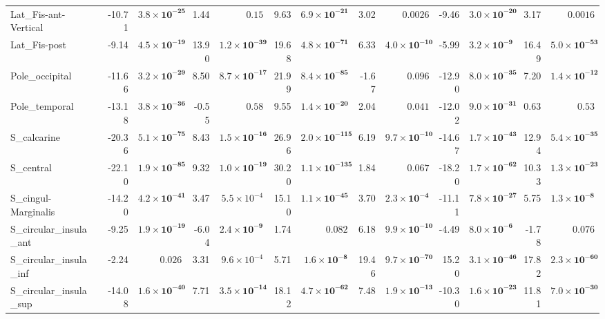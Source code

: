 {\begin{longtable}{llrrrrrrrrrrrr}
Lat\_Fis-ant-Vertical &  & -10.71 & $\mathbf{3.8{\times}10^{-25}}$ & 1.44 & $0.15$ & 9.63 & $\mathbf{6.9{\times}10^{-21}}$ & 3.02 & $0.0026$ & -9.46 & $\mathbf{3.0{\times}10^{-20}}$ & 3.17 & $0.0016$ \\
Lat\_Fis-post &  & -9.14 & $\mathbf{4.5{\times}10^{-19}}$ & 13.90 & $\mathbf{1.2{\times}10^{-39}}$ & 19.68 & $\mathbf{4.8{\times}10^{-71}}$ & 6.33 & $\mathbf{4.0{\times}10^{-10}}$ & -5.99 & $\mathbf{3.2{\times}10^{-9}}$ & 16.49 & $\mathbf{5.0{\times}10^{-53}}$ \\
Pole\_occipital &  & -11.66 & $\mathbf{3.2{\times}10^{-29}}$ & 8.50 & $\mathbf{8.7{\times}10^{-17}}$ & 21.99 & $\mathbf{8.4{\times}10^{-85}}$ & -1.67 & $0.096$ & -12.90 & $\mathbf{8.0{\times}10^{-35}}$ & 7.20 & $\mathbf{1.4{\times}10^{-12}}$ \\
Pole\_temporal &  & -13.18 & $\mathbf{3.8{\times}10^{-36}}$ & -0.55 & $0.58$ & 9.55 & $\mathbf{1.4{\times}10^{-20}}$ & 2.04 & $0.041$ & -12.02 & $\mathbf{9.0{\times}10^{-31}}$ & 0.63 & $0.53$ \\
S\_calcarine &  & -20.36 & $\mathbf{5.1{\times}10^{-75}}$ & 8.43 & $\mathbf{1.5{\times}10^{-16}}$ & 26.96 & $\mathbf{2.0{\times}10^{-115}}$ & 6.19 & $\mathbf{9.7{\times}10^{-10}}$ & -14.67 & $\mathbf{1.7{\times}10^{-43}}$ & 12.94 & $\mathbf{5.4{\times}10^{-35}}$ \\
S\_central &  & -22.10 & $\mathbf{1.9{\times}10^{-85}}$ & 9.32 & $\mathbf{1.0{\times}10^{-19}}$ & 30.20 & $\mathbf{1.1{\times}10^{-135}}$ & 1.84 & $0.067$ & -18.20 & $\mathbf{1.7{\times}10^{-62}}$ & 10.33 & $\mathbf{1.3{\times}10^{-23}}$ \\
S\_cingul-Marginalis &  & -14.20 & $\mathbf{4.2{\times}10^{-41}}$ & 3.47 & $5.5{\times}10^{-4}$ & 15.10 & $\mathbf{1.1{\times}10^{-45}}$ & 3.70 & $\mathbf{2.3{\times}10^{-4}}$ & -11.11 & $\mathbf{7.8{\times}10^{-27}}$ & 5.75 & $\mathbf{1.3{\times}10^{-8}}$ \\
S\_circular\_insula\_ant &  & -9.25 & $\mathbf{1.9{\times}10^{-19}}$ & -6.04 & $\mathbf{2.4{\times}10^{-9}}$ & 1.74 & $0.082$ & 6.18 & $\mathbf{9.9{\times}10^{-10}}$ & -4.49 & $\mathbf{8.0{\times}10^{-6}}$ & -1.78 & $0.076$ \\
S\_circular\_insula\_inf &  & -2.24 & $0.026$ & 3.31 & $9.6{\times}10^{-4}$ & 5.71 & $\mathbf{1.6{\times}10^{-8}}$ & 19.46 & $\mathbf{9.7{\times}10^{-70}}$ & 15.20 & $\mathbf{3.1{\times}10^{-46}}$ & 17.82 & $\mathbf{2.3{\times}10^{-60}}$ \\
S\_circular\_insula\_sup &  & -14.08 & $\mathbf{1.6{\times}10^{-40}}$ & 7.71 & $\mathbf{3.5{\times}10^{-14}}$ & 18.12 & $\mathbf{4.7{\times}10^{-62}}$ & 7.48 & $\mathbf{1.9{\times}10^{-13}}$ & -10.30 & $\mathbf{1.6{\times}10^{-23}}$ & 11.81 & $\mathbf{7.0{\times}10^{-30}}$ \\

\end{longtable}}
